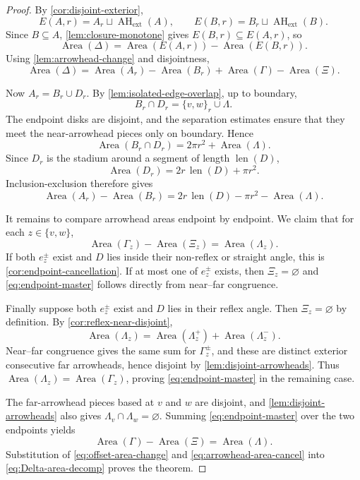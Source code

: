 \documentclass[11pt]{article}
\newcommand{\Area}{\operatorname{Area}}
\newcommand{\len}{\operatorname{len}}
\newcommand{\AHext}{\operatorname{AH}_{\mathrm{ext}}}
\numberwithin{equation}{section}
\begin{document}
\begin{proof}
By \cref{cor:disjoint-exterior},
\[
E(A,r)=A_r\sqcup\AHext(A),
\qquad
E(B,r)=B_r\sqcup\AHext(B).
\]
Since $B\subseteq A$, \cref{lem:closure-monotone} gives $E(B,r)\subseteq E(A,r)$, so
\[
\Area(\Delta)=\Area(E(A,r))-\Area(E(B,r)).
\]
Using \cref{lem:arrowhead-change} and disjointness,
\begin{equation}\label{eq:Delta-area-decomp}
\Area(\Delta)
=
\Area(A_r)-\Area(B_r)
+
\Area(\Gamma)-\Area(\Xi).
\end{equation}

Now $A_r=B_r\cup D_r$. By \cref{lem:isolated-edge-overlap}, up to boundary,
\[
B_r\cap D_r=\{v,w\}_r\cup\Lambda.
\]
The endpoint disks are disjoint, and the separation estimates ensure that they meet the near-arrowhead pieces only on boundary. Hence
\[
\Area(B_r\cap D_r)=2\pi r^2+\Area(\Lambda).
\]
Since $D_r$ is the stadium around a segment of length $\len(D)$,
\[
\Area(D_r)=2r\,\len(D)+\pi r^2.
\]
Inclusion-exclusion therefore gives
\begin{equation}\label{eq:offset-area-change}
\Area(A_r)-\Area(B_r)
=
2r\,\len(D)-\pi r^2-\Area(\Lambda).
\end{equation}

It remains to compare arrowhead areas endpoint by endpoint. We claim that for each $z\in\{v,w\}$,
\begin{equation}\label{eq:endpoint-master}
\Area(\Gamma_z)-\Area(\Xi_z)=\Area(\Lambda_z).
\end{equation}
If both $e_z^\pm$ exist and $D$ lies inside their non-reflex or straight angle, this is \cref{cor:endpoint-cancellation}. If at most one of $e_z^\pm$ exists, then $\Xi_z=\varnothing$ and \eqref{eq:endpoint-master} follows directly from near--far congruence.

Finally suppose both $e_z^\pm$ exist and $D$ lies in their reflex angle. Then $\Xi_z=\varnothing$ by definition. By \cref{cor:reflex-near-disjoint},
\[
\Area(\Lambda_z)
=
\Area(\Lambda_z^+)+\Area(\Lambda_z^-).
\]
Near--far congruence gives the same sum for $\Gamma_z^\pm$, and these are distinct exterior consecutive far arrowheads, hence disjoint by \cref{lem:disjoint-arrowheads}. Thus $\Area(\Lambda_z)=\Area(\Gamma_z)$, proving \eqref{eq:endpoint-master} in the remaining case.

The far-arrowhead pieces based at $v$ and $w$ are disjoint, and \cref{lem:disjoint-arrowheads} also gives $\Lambda_v\cap\Lambda_w=\varnothing$. Summing \eqref{eq:endpoint-master} over the two endpoints yields
\begin{equation}\label{eq:arrowhead-area-cancel}
\Area(\Gamma)-\Area(\Xi)=\Area(\Lambda).
\end{equation}
Substitution of \eqref{eq:offset-area-change} and \eqref{eq:arrowhead-area-cancel} into \eqref{eq:Delta-area-decomp} proves the theorem.
\end{proof}
\end{document}
